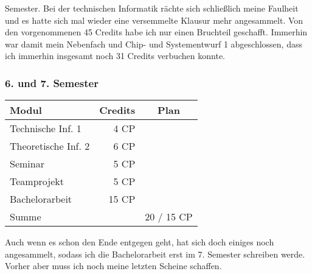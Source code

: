 Semester. Bei der technischen Informatik rächte sich schließlich meine
Faulheit und es hatte sich mal wieder eine versemmelte Klausur mehr angesammelt.
Von den vorgenommenen 45 Credits habe ich nur einen Bruchteil geschafft.
Immerhin war damit mein Nebenfach und Chip- und Systementwurf 1
abgeschlossen, dass ich immerhin insgesamt noch 31 Credits verbuchen
konnte.

\subsubsection*{6. und 7. Semester}
{
\footnotesize
\begin{tabular}{|l|r|c|}
\hline \textbf{Modul}		& \textbf{Credits} 	& \textbf{Plan} \\ 
\hline
\hline Technische Inf. 1 	& 4 CP 				& \nx 			\\ 
\hline Theoretische Inf. 2 	& 6 CP 				& \nx 			\\ 
\hline Seminar				& 5 CP 				& \nx 			\\ 
\hline Teamprojekt 			& 5 CP 				& \nx 			\\ 
\hline 
\hline Bachelorarbeit 		& 15 CP 			& \nx 			\\ 
\hline 
\hline Summe 				&  					& 20 / 15 CP 		\\ 
\hline 
\end{tabular}
}

Auch wenn es schon den Ende entgegen geht, hat sich doch einiges noch
angesammelt, sodass ich die Bachelorarbeit erst im 7. Semester
schreiben werde. Vorher aber muss
ich noch meine letzten Scheine schaffen.

